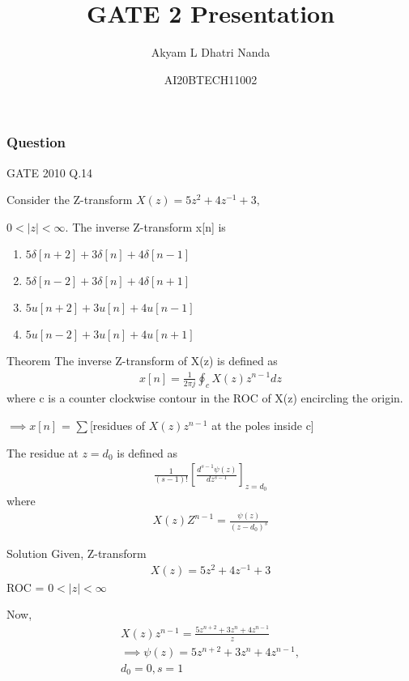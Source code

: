 \documentclass{beamer}
\title{GATE 2 Presentation}
\author{Akyam L Dhatri Nanda}
\date{AI20BTECH11002}
\providecommand{\sbrak}[1]{\ensuremath{{}\left[#1\right]}}
\begin{document}
\begin{frame}
\titlepage
\end{frame}

\begin{frame}
\frametitle{Question}
\begin{block}{GATE 2010 Q.14}

Consider the Z-transform $X(z) = 5z^2 + 4z^{-1} + 3,$

$ 0 < |z| < \infty$. The inverse Z-transform x[n] is

\begin{enumerate}[label={\Alph*)}]
\item $5\delta[n+2] + 3\delta[n] + 4\delta[n-1]$
\item $5\delta[n-2] + 3\delta[n] + 4\delta[n+1]$
\item $5u[n+2] + 3u[n] + 4u[n-1]$
\item $5u[n-2] + 3u[n] + 4u[n+1]$
\end{enumerate}
\end{block}
\end{frame}

\begin{frame}{}
    \begin{block}{Theorem}
    The inverse Z-transform of X(z) is defined as 
\begin{align}
    x[n] = \frac{1}{2\pi j} \oint_{c} X(z)z^{n-1}dz \label{eq 1}
\end{align}
where c is a counter clockwise contour in the ROC of X(z) encircling the origin. 

$\implies x[n]$ = $\sum$[residues of $X(z)z^{n-1}$ at the poles inside c]

The residue at $z = d_0$ is defined as 
\begin{align}
    \frac{1}{(s-1)!}\sbrak{\frac{d^{s-1}\psi(z)}{dz^{s-1}}}_{z=d_0}
\end{align}
where
\begin{align}
X(z)Z^{n-1} = \frac{\psi(z)}{(z-d_0)^s}
\end{align}
    \end{block}
\end{frame}

\begin{frame}{Solution}
    Given, Z-transform 
\begin{align}
    X(z) = 5z^2 + 4z^{-1} + 3 \label{eq 0}
\end{align}
ROC = $0<|z|<\infty$

Now,
\begin{align}
X(z)z^{n-1} = \frac{5z^{n+2} + 3z^n + 4z^{n-1}}{z}\\
\implies \psi(z) = 5z^{n+2} + 3z^n + 4z^{n-1},\\ 
d_0 = 0, s = 1
\end{align}
\end{frame}
\end{document}

